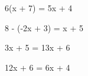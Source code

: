 \begin{pageenonces}
    \begin{tcolorbox}[carteenonce={5}]
        6(x + 7) = 5x + 4
    \end{tcolorbox}
    \begin{tcolorbox}[carteenonce={6}]
        8 - (-2x + 3) = x + 5
    \end{tcolorbox}
    \begin{tcolorbox}[carteenonce={7}]
        3x + 5 = 13x + 6
    \end{tcolorbox}
    \begin{tcolorbox}[carteenonce={8}]
        12x + 6 = 6x + 4
    \end{tcolorbox}
\end{pageenonces}

